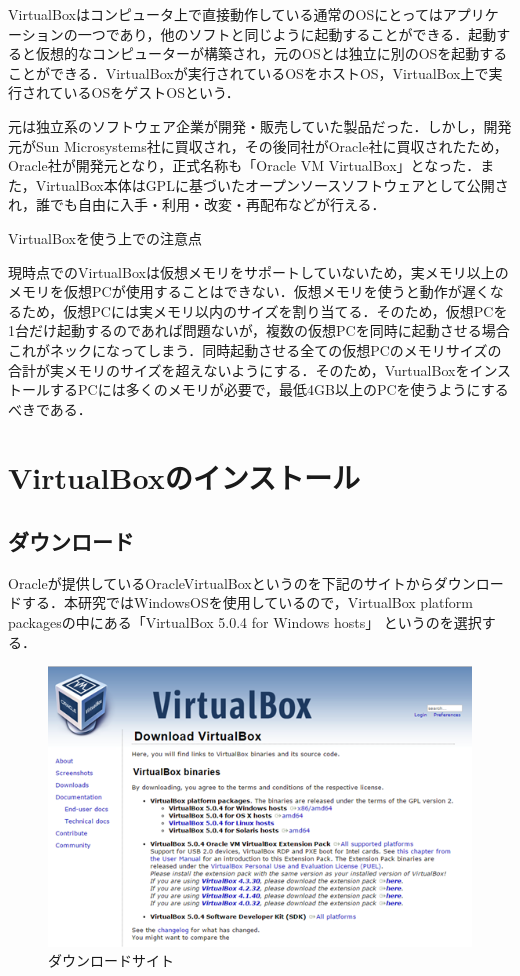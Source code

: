 VirtualBoxはコンピュータ上で直接動作している通常のOSにとってはアプリケーションの一つであり，他のソフトと同じように起動することができる．起動すると仮想的なコンピューターが構築され，元のOSとは独立に別のOSを起動することができる．VirtualBoxが実行されているOSをホストOS，VirtualBox上で実行されているOSをゲストOSという．

元は独立系のソフトウェア企業が開発・販売していた製品だった．しかし，開発元がSun Microsystems社に買収され，その後同社がOracle社に買収されたため，Oracle社が開発元となり，正式名称も「Oracle VM VirtualBox」となった．また，VirtualBox本体はGPLに基づいたオープンソースソフトウェアとして公開され，誰でも自由に入手・利用・改変・再配布などが行える．

VirtualBoxを使う上での注意点

現時点でのVirtualBoxは仮想メモリをサポートしていないため，実メモリ以上のメモリを仮想PCが使用することはできない．仮想メモリを使うと動作が遅くなるため，仮想PCには実メモリ以内のサイズを割り当てる．そのため，仮想PCを1台だけ起動するのであれば問題ないが，複数の仮想PCを同時に起動させる場合これがネックになってしまう．同時起動させる全ての仮想PCのメモリサイズの合計が実メモリのサイズを超えないようにする．そのため，VurtualBoxをインストールするPCには多くのメモリが必要で，最低4GB以上のPCを使うようにするべきである．


\clearpage


\section{VirtualBoxのインストール}

\subsection{ダウンロード}

Oracleが提供しているOracleVirtualBoxというのを下記のサイトからダウンロードする．本研究ではWindowsOSを使用しているので，VirtualBox platform packagesの中にある「VirtualBox 5.0.4 for Windows hosts」 というのを選択する．

\begin{figure}[H]
\centering
\includegraphics[width=13cm]{VirtualBox.png}
\caption{ダウンロードサイト}\label{サンプル図}
\end{figure}


